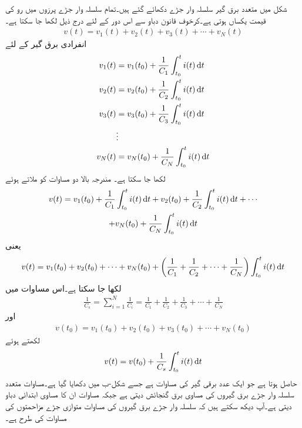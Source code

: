 شکل  میں متعدد برق گیر سلسلہ وار جڑے دکھائے گئے ہیں۔تمام سلسلہ وار جڑے پرزوں میں رو کی قیمت یکساں ہوتی ہے۔کرخوف قانون دباو سے اس دور کے لئے درج ذیل لکھا جا سکتا ہے۔
\begin{align*}
v(t)=v_1(t)+v_2(t)+v_3(t)+\cdots +v_N(t)
\end{align*}
انفرادی برق گیر کے لئے
\begin{align*}
v_1(t)&=v_1(t_0)+\frac{1}{C_1}\int_{t_0}^{t} i(t) \dif t\\
v_2(t)&=v_2(t_0)+\frac{1}{C_2}\int_{t_0}^{t} i(t) \dif t\\
v_3(t)&=v_3(t_0)+\frac{1}{C_3}\int_{t_0}^{t} i(t) \dif t\\
& \vdots\\
v_N(t)&=v_N(t_0)+\frac{1}{C_N}\int_{t_0}^{t} i(t) \dif t
\end{align*}
لکھا جا سکتا ہے۔ مندرجہ بالا دو مساوات کو ملاتے ہوئے
\begin{multline*}
v(t)=v_1(t_0)+\frac{1}{C_1}\int_{t_0}^{t} i(t) \dif t +v_2(t_0)+\frac{1}{C_2}\int_{t_0}^{t} i(t) \dif t +\cdots\\
+v_N(t_0)+\frac{1}{C_N}\int_{t_0}^{t} i(t) \dif t
\end{multline*}
یعنی
\begin{multline*}
v(t)=v_1(t_0)+v_2(t_0)+\cdots+v_N(t_0)+\left(\frac{1}{C_1}+\frac{1}{C_2} +\cdots + \frac{1}{C_N}\right)\int_{t_0}^{t} i(t) \dif t
\end{multline*}
لکھا جا سکتا ہے۔اس مساوات میں
\begin{align}\label{مساوات_امالہ_سلسلہ_وار_برق_گیر_کا_مساوی}
\frac{1}{C_s}=\sum_{i=1}^{N} \frac{1}{C_i}=\frac{1}{C_1}+\frac{1}{C_2}+\frac{1}{C_3}+\cdots+\frac{1}{C_N}
\end{align}
اور
\begin{align}\label{مساوات_امالہ_سلسلہ_وار_برق_گیر_کا_مساوی_ابتدائی_دباو}
v(t_0)=v_1(t_0)+v_2(t_0)+v_3(t_0)+\cdots+v_N(t_0)
\end{align}
لکھتے ہوئے
\begin{align}
v(t)=v(t_0)+\frac{1}{C_s} \int_{t_0}^{t} i(t)\dif t
\end{align}
حاصل ہوتا ہے جو ایک عدد برقی گیر کی مساوات ہے جسے شکل-ب میں دکھایا گیا ہے۔مساوات  متعدد سلسلہ وار جڑے برق گیروں کی مساوی برق گنجائش  دیتی ہے جبکہ مساوات  ان کا مساوی ابتدائی دباو دیتی ہے۔آپ دیکھ سکتے ہیں کہ سلسلہ وار جڑے برق گیروں کی مساوات متوازی جڑے مزاحمتوں کی مساوات کی طرح ہے۔

